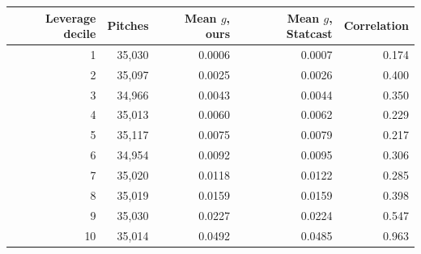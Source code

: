 \begin{tabular}{rrrrr}
\toprule
Leverage decile & Pitches & Mean $g$, ours & Mean $g$, Statcast & Correlation \\
\midrule
1 & 35{,}030 & 0.0006 & 0.0007 & 0.174 \\
2 & 35{,}097 & 0.0025 & 0.0026 & 0.400 \\
3 & 34{,}966 & 0.0043 & 0.0044 & 0.350 \\
4 & 35{,}013 & 0.0060 & 0.0062 & 0.229 \\
5 & 35{,}117 & 0.0075 & 0.0079 & 0.217 \\
6 & 34{,}954 & 0.0092 & 0.0095 & 0.306 \\
7 & 35{,}020 & 0.0118 & 0.0122 & 0.285 \\
8 & 35{,}019 & 0.0159 & 0.0159 & 0.398 \\
9 & 35{,}030 & 0.0227 & 0.0224 & 0.547 \\
10 & 35{,}014 & 0.0492 & 0.0485 & 0.963 \\
\bottomrule
\end{tabular}
